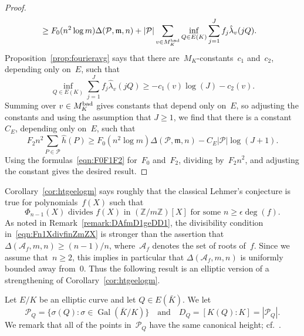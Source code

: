 \begin{proof}
\begin{align*}
  &\ge F_0(n^2\log m){\Delta}({{\mathcal P}},{{\mathfrak{m}}},n)
       + |{{\mathcal P}}|\sum_{v\in M_K^{{\textup{bad}}}} \inf_{Q\in E(K)} \sum_{j=1}^J f_j{\hat\lambda}_v(jQ).
\end{align*}
Proposition~\ref{prop:fourieravg} says that there
are~$M_K$-constants~$c_1$ and~$c_2$, depending only on~$E$, such that
\[
  \inf_{Q\in E(K)} \sum_{j=1}^J f_j{\hat\lambda}_v(jQ) \ge -c_1(v)\log(J)-c_2(v).
\]
Summing over $v\in M_K^{{\textup{bad}}}$ gives constants that depend only on~$E$,
so adjusting the constants and using the assumption that $J\ge1$, we
find that there is a constant~$C_E$, depending only on~$E$, such that
\[
  F_2n^2\sum_{P\in{{\mathcal P}}} {{\hat h}}(P)
  \ge F_0(n^2\log m){\Delta}({{\mathcal P}},{{\mathfrak{m}}},n)
       -C_E |{{\mathcal P}}|\log(J+1).
\]
Using the formulas~\eqref{eqn:F0F1F2} for~$F_0$ and~$F_2$, dividing
by~$F_2n^2$, and adjusting the constant gives the desired result.
\end{proof}

Corollary~\ref{cor:htgeelogm} says roughly that the classical Lehmer's
conjecture is true for polynomials~$f(X)$ such that
\begin{equation}
  \label{eqn:Fn1XdivfinZmZX}
  \text{${\Phi}_{n-1}(X)$ divides $f(X)$ in $({\mathbb{Z}}/m{\mathbb{Z}})[X]$ for some
    $n\ge{\epsilon}\deg(f)$.}
\end{equation}
As noted in Remark~\ref{remark:DAfmD1geDD1}, the divisibility
condition in~\eqref{eqn:Fn1XdivfinZmZX} is stronger than the assertion
that ${\Delta}({{\mathcal A}}_f,m,n)\ge(n-1)/n$, where~${{\mathcal A}}_f$ denotes the set of
roots of~$f$. Since we assume that~$n\ge2$, this implies in particular
that ${\Delta}({{\mathcal A}}_f,m,n)$ is uniformly bounded away from~$0$.  Thus the
following result is an elliptic version of a strengthening of
Corollary~\ref{cor:htgeelogm}.

\begin{definition}
Let $E/K$ be an elliptic curve and let $Q\in E({{\bar K}})$. We let
\[
  {{\mathcal P}}_Q = \{{\sigma}(Q) : {\sigma}\in{\operatorname{Gal}}({{\bar K}}/K)\}
  \quad\text{and}\quad
  D_Q = [K(Q):K] = |{{\mathcal P}}_Q|.
\]
We remark that all of the points in~${{\mathcal P}}_Q$ have the same canonical
height; cf.~\cite[Theorem~VIII.5.10]{MR2514094}.
\end{definition}

